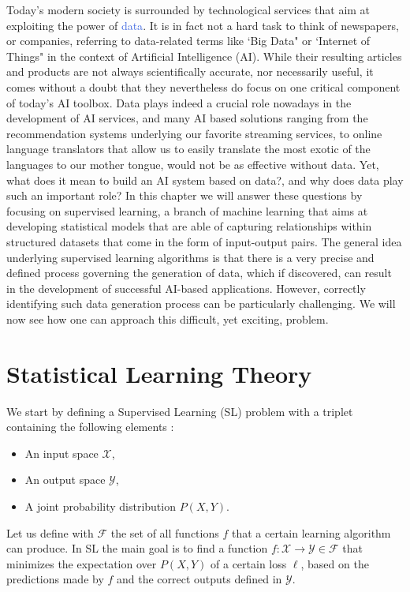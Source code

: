 Today's modern society is surrounded by technological services that aim at exploiting the power of \textcolor{RoyalBlue}{data}. It is in fact not a hard task to think of newspapers, or companies, referring to data-related terms like `Big Data" or `Internet of Things" in the context of Artificial Intelligence (AI). While their resulting articles and products are not always scientifically accurate, nor necessarily useful, it comes without a doubt that they nevertheless do focus on one critical component of today's AI toolbox. Data plays indeed a crucial role  nowadays in the development of AI services, and many AI based solutions ranging from the recommendation systems underlying our favorite streaming services, to online language translators that allow us to easily translate the most exotic of the languages to our mother tongue, would not be as effective without data. Yet, what does it mean to build an AI system based on data?, and why does data play such an important role? In this chapter we will answer these questions by focusing on supervised learning, a branch of machine learning that aims at developing statistical models that are able of capturing relationships within structured datasets that come in the form of input-output pairs. The general idea underlying supervised learning algorithms is that there is a very precise and defined process governing the generation of data, which if discovered, can result in the development of successful AI-based applications. However, correctly identifying such data generation process can be particularly challenging. We will now see how one can approach this difficult, yet exciting, problem.    

\section{Statistical Learning Theory}
\label{sec:learning_from_data}

We start by defining a Supervised Learning (SL) problem with a triplet containing the following elements \cite{friedman2001elements, louppe2014understanding}:
\begin{itemize}
	\item An input space $\mathcal{X}$,
	\item An output space $\mathcal{Y}$,
	\item A joint probability distribution $P(X,Y)$.
\end{itemize}
Let us define with $\mathcal{F}$ the set of all functions $f$ that a certain learning algorithm can produce. In SL the main goal is to find a function $f:\mathcal{X}\rightarrow\mathcal{Y} \in \mathcal{F}$ that minimizes the expectation over $P(X,Y)$ of a certain loss $\ell$, based on the predictions made by $f$ and the correct outputs defined in $\mathcal{Y}$.

